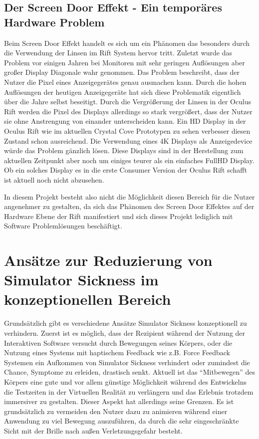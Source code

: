 \documentclass[pagesize, paper=a4, fontsize=12pt,titlepage=true, headings=small, headnosepline, abstractoff, liststotoc, nochapterprefix, plainheadsepline, twoside]{scrreprt}
\begin{document}
\subsection{Der Screen Door Effekt - Ein temporäres Hardware Problem}
Beim Screen Door Effekt handelt es sich um ein Phänomen das besonders durch die Verwendung der Linsen im Rift System hervor tritt. Zuletzt wurde das Problem vor einigen Jahren bei Monitoren mit sehr geringen Auflösungen aber großer Display Diagonale wahr genommen. Das Problem beschreibt, dass der Nutzer die Pixel eines Anzeigegerätes genau ausmachen kann. Durch die hohen Auflösungen der heutigen Anzeigegeräte hat sich diese Problematik eigentlich über die Jahre selbst beseitigt. Durch die Vergrößerung der Linsen in der Oculus Rift werden die Pixel des Displays allerdings so stark vergrößert, dass der Nutzer sie ohne Anstrengung von einander unterscheiden kann. Ein HD Display in der Oculus Rift wie im aktuellen Crystal Cove Prototypen zu sehen verbesser diesen Zustand schon ausreichend. Die Verwendung eines 4K Displays als Anzeigedevice würde das Problem gänzlich lösen. Diese Displays sind in der Herstellung zum aktuellen Zeitpunkt aber noch um einiges teurer als ein einfaches FullHD Display. Ob ein solches Display es in die erste Consumer Version der Oculus Rift schafft ist aktuell noch nicht abzusehen. 

In diesem Projekt besteht also nicht die Möglichkeit diesen Bereich für die Nutzer angenehmer zu gestalten, da sich das Phänomen des Screen Door Effektes auf der Hardware Ebene der Rift manifestiert und sich dieses Projekt lediglich mit Software Problemlösungen beschäftigt.

\section{Ansätze zur Reduzierung von Simulator Sickness im konzeptionellen Bereich}
Grundsätzlich gibt es verschiedene Ansätze Simulator Sickness konzeptionell zu verhindern. Zuerst ist es möglich, dass der Rezipient während der Nutzung der Interaktiven Software versucht durch Bewegungen seines Körpers, oder die Nutzung eines Systems mit haptischem Feedback wie z.B. Force Feedback Systemen ein Aufkommen von Simulator Sickness verhindert oder zumindest die Chance, Symptome zu erleiden, drastisch senkt. Aktuell ist das "`Mitbewegen"' des Körpers eine gute und vor allem günstige Möglichkeit während des Entwickelns die Testzeiten in der Virtuellen Realität zu verlängern und das Erlebnis trotzdem immersiver zu gestalten. Dieser Aspekt hat allerdings seine Grenzen. Es ist grundsätzlich zu vermeiden den Nutzer dazu zu animieren während einer Anwendung zu viel Bewegung auszuführen, da durch die sehr eingeschränkte Sicht mit der Brille nach außen Verletzungsgefahr besteht.
\end{document}
